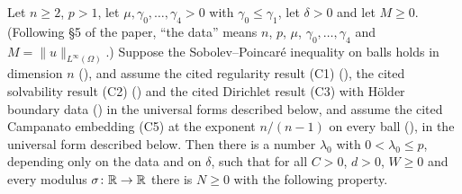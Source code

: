 \begin{theorem}[Theorem 6]
Let $n\ge2$, $p>1$, let $\mu,\gamma_0,\dots,\gamma_4>0$ with
$\gamma_0\le\gamma_1$, let $\delta>0$ and let $M\ge0$.  (Following \S5 of the
paper, ``the data'' means $n$, $p$, $\mu$, $\gamma_0,\dots,\gamma_4$ and
$M=\|u\|_{L^\infty(\Omega)}$.)  Suppose the Sobolev--Poincar\'e inequality on balls holds in
dimension $n$ (), and assume the cited
regularity result (C1) (), the cited solvability
result (C2) () and the cited Dirichlet result (C3)
with H\"older boundary data () in the universal
forms described below, and assume the cited Campanato embedding (C5) at the
exponent $n/(n-1)$ on every ball (), in the
universal form described below.  Then there is a number $\lambda_0$ with
$0<\lambda_0\le p$, depending only on the data and on $\delta$, such that for
all $C>0$, $d>0$, $W\ge0$ and every modulus $\sigma\colon\mathbb{R}\to\mathbb{R}$ there is
$N\ge0$ with the following property.


\end{theorem}
